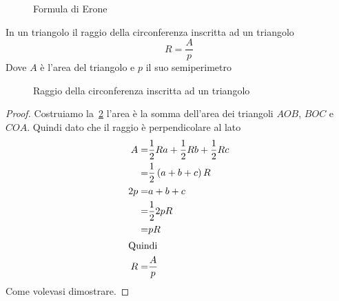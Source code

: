 \begin{figure}
	\centering
	
	\caption{Formula di Erone}
	\label{fig:erone1}
\end{figure}
\begin{thm}\label{thm:raggiocirconferenzainscrittatriangolo}
In un triangolo il raggio della circonferenza inscritta ad un triangolo
\[R=\dfrac{A}{p}\]
Dove $A$ è l'area del triangolo e $p$ il suo semiperimetro
\end{thm}
\begin{figure}
	\centering
	
	\caption{Raggio della circonferenza inscritta ad un triangolo}
	\label{fig:raggiocirconferenzainscrittatriangolo}
\end{figure}
\begin{proof}
		Costruiamo la~\cref{fig:raggiocirconferenzainscrittatriangolo} l'area è la somma dell'area dei  triangoli $AOB$, $BOC$ e $COA$. Quindi dato che il raggio è perpendicolare al lato
		\begin{align*}
			A=&\dfrac{1}{2}Ra+\dfrac{1}{2}Rb+\dfrac{1}{2}Rc\\
			=&\dfrac{1}{2}\left(a+b+c\right)R\\
			2p=&a+b+c\\
			=&\dfrac{1}{2}2pR\\
			=&pR\\
			\intertext{Quindi}
			R=&\dfrac{A}{p}\\
		\end{align*}
	Come volevasi dimostrare.
\end{proof}
